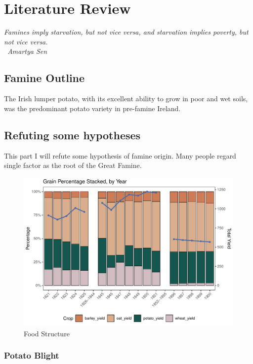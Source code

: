 \chapter{Literature Review}

\vspace{.3cm}

\textit{Famines imply starvation, but not vice versa, and starvation implies poverty, but not vice versa.\\
\textemdash\ Amartya Sen}

\section{Famine Outline}

The Irish lumper potato, with its excellent ability to grow in poor and wet soils, was the predominant potato variety in pre-famine Ireland.

\section{Refuting some hypotheses}

This part I will refute some hypothesis of famine origin. Many people regard single factor as the root of the Great Famine.

\begin{figure}[h]
    \centering
    \caption{Food Structure}
    \includegraphics[width=.9\textwidth]{../03_outputs/food_structure.pdf}
\end{figure}

\subsection{Potato Blight}

